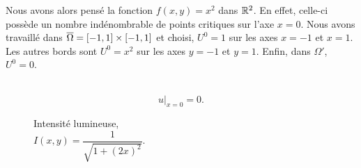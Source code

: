Nous avons alors pensé la fonction $f(x,y) = x^2$ dans $\mathbb{R}^2$. En effet, celle-ci possède un nombre indénombrable de points critiques sur l'axe $x=0$. Nous avons travaillé dans $\overline{\Omega} = \mathopen{}\left[-1,1\right]\mathclose{}\times \mathopen{}\left[-1,1\right]\mathclose{}$ et choisi, $U^0=1$ sur les axes $x=-1$ et $x=1$. Les autres bords sont $U^0=x^2$ sur les axes $y=-1$ et $y=1$. Enfin, dans $\Omega'$, $U^0=0$.

\begin{figure}[!htb]
    \centering
    \begin{minipage}[t]{0.48\textwidth}
        \centering
        \caption{Intensité lumineuse,\\[1ex] \centering $I(x,y)=\dfrac{1}{\sqrt{1+{(2x)}^2}}.$}
        \label{Fig:int_x2}
    \end{minipage}%
    \hfill
    \begin{minipage}[t]{0.48\textwidth}
        \centering
        \vspace{0.9em}

        \centering
        \\[0.5em]
        \[
            u\big|_{x=0} = 0.
        \]\label{Fig:x2}
    \end{minipage}
\end{figure}

